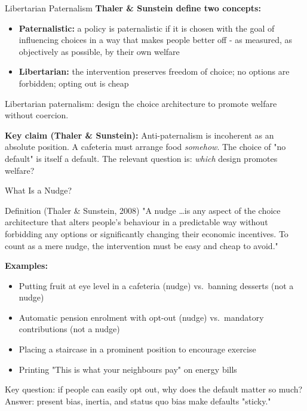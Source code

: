 \documentclass[10pt]{beamer}
\begin{document}
\begin{frame}{Libertarian Paternalism}
\textbf{Thaler \& Sunstein define two concepts:}


\begin{itemize}
\item \textbf{Paternalistic:} a policy is paternalistic if it is chosen with the goal of influencing choices in a way that makes people better off - as measured, as objectively as possible, by their own welfare
\item \textbf{Libertarian:} the intervention preserves freedom of choice; no options are forbidden; opting out is cheap
\end{itemize}


\alert{Libertarian paternalism:} design the choice architecture to promote welfare without coercion.


\textbf{Key claim (Thaler \& Sunstein):}
Anti-paternalism is incoherent as an absolute position.
A cafeteria must arrange food \emph{somehow}.
The choice of "no default" is itself a default.
The relevant question is: \emph{which} design promotes welfare?
\end{frame}


\begin{frame}{What Is a Nudge?}

\begin{block}{Definition (Thaler \& Sunstein, 2008)}
"A nudge \ldots is any aspect of the choice architecture that alters people's behaviour in a predictable way without forbidding any options or significantly changing their economic incentives. To count as a mere nudge, the intervention must be easy and cheap to avoid."
\end{block}


\textbf{Examples:}
\begin{itemize}
\item Putting fruit at eye level in a cafeteria (nudge) vs.\ banning desserts (not a nudge)
\item Automatic pension enrolment with opt-out (nudge) vs.\ mandatory contributions (not a nudge)
\item Placing a staircase in a prominent position to encourage exercise
\item Printing "This is what your neighbours pay" on energy bills
\end{itemize}


\alert{Key question:} if people can easily opt out, why does the default matter so much?
Answer: present bias, inertia, and status quo bias make defaults "sticky."
\end{frame}
\end{document}
